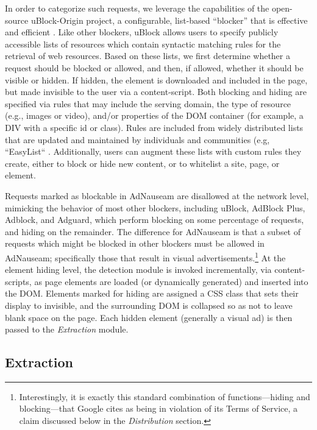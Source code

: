 \documentclass[conference]{IEEEtran}
\begin{document}
In order to categorize such requests, we leverage the capabilities of the open-source uBlock-Origin \cite{Gorhill} project, a configurable, list-based “blocker” that is effective and efficient \cite{Wills}. Like other blockers, uBlock allows users to specify publicly accessible lists of resources which contain syntactic matching rules for the retrieval of web resources. Based on these lists, we first determine whether a request should be blocked or allowed, and then, if allowed, whether it should be visible or hidden. If hidden, the element is downloaded and included in the page, but made invisible to the user via a content-script. Both blocking and hiding are specified via rules that may include the serving domain, the type of resource (e.g., images or video), and/or properties of the DOM container (for example, a DIV with a specific id or class). Rules are included from widely distributed lists that are updated and maintained by individuals and communities (e.g, “EasyList“ \cite{EasyList}. Additionally, users can augment these lists with custom rules they create, either to block or hide new content, or to whitelist a site, page, or element.

Requests marked as blockable in AdNauseam are disallowed at the network level, mimicking the behavior of most other blockers, including uBlock, AdBlock Plus, Adblock, and Adguard, which perform blocking on some percentage of requests, and hiding on the remainder. The difference for AdNauseam is that a subset of requests which might be blocked in other blockers must be allowed in AdNauseam; specifically those that result in visual advertisements.\footnote{Interestingly, it is exactly this standard combination of functions---hiding and blocking---that Google cites as being in violation of its Terms of Service, a claim discussed below in the \emph{Distribution} section.} At the element hiding level, the detection module is invoked incrementally, via content-scripts, as page elements are loaded (or dynamically generated) and inserted into the DOM. Elements marked for hiding are assigned a CSS class that sets their display to invisible, and the surrounding DOM is collapsed so as not to leave blank space on the page. Each hidden element (generally a visual ad) is then passed to the \emph{Extraction} module.


\subsection{Extraction}
\end{document}
